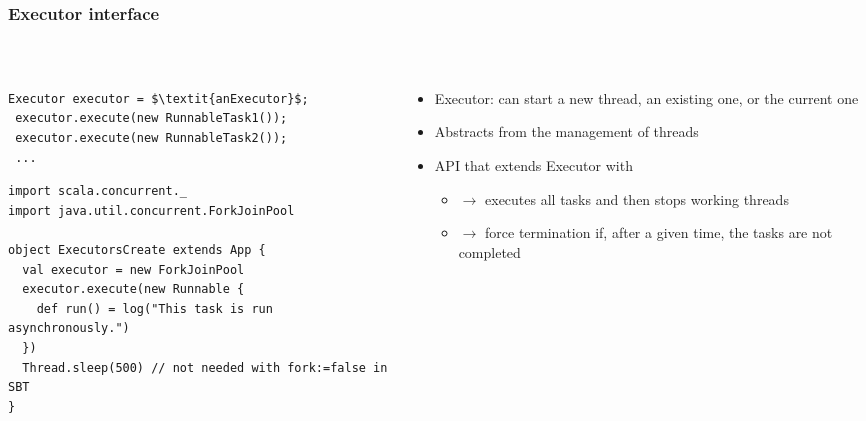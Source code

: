 \documentclass[aspectratio=169]{beamer}
\begin{document}
\begin{frame}[fragile]\frametitle{Executor interface}
~\\[-8mm]
\begin{columns}
\begin{column}{0.54\textwidth}
\begin{lstlisting}[emph={executor},mathescape]
 Executor executor = $\textit{anExecutor}$;
 executor.execute(new RunnableTask1());
 executor.execute(new RunnableTask2());
 ...
\end{lstlisting}
\begin{lstlisting}[emph={executor}]
import scala.concurrent._
import java.util.concurrent.ForkJoinPool

object ExecutorsCreate extends App {
  val executor = new ForkJoinPool
  executor.execute(new Runnable {
    def run() = log("This task is run asynchronously.")
  })
  Thread.sleep(500) // not needed with fork:=false in SBT
}
\end{lstlisting}
\end{column}
\begin{column}{0.49\textwidth}
\begin{itemize}
  \item \alert{Executor:} can start a new thread, an existing one, or the current one
  \item Abstracts from the management of threads
  \item {} API that extends Executor with 
    \begin{itemize}
      \item {} $\to$ executes all tasks and then stops working threads
      \item {} $\to$ force termination if, after a given time, the tasks are not completed
    \end{itemize}
\end{itemize}
\end{column}
\end{columns}
\end{frame}
\end{document}
